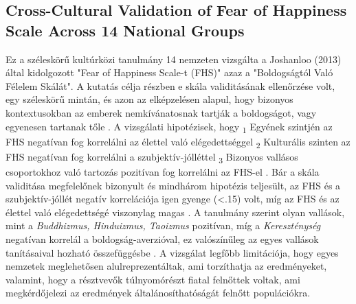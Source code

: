 \subsection*{Cross-Cultural Validation of
	Fear of Happiness Scale Across 14 National Groups \parencite{joshanloo_lepshokova_panyusheva_natalia_poon_yeung_sundaram_achoui_asano_igarashi}}
Ez a széleskörű kultúrközi tanulmány 14 nemzeten vizsgálta a Joshanloo (2013) által kidolgozott "Fear of Happiness Scale-t (FHS)" azaz a "Boldogságtól Való Félelem Skálát". A kutatás célja részben e skála validitásának ellenőrzése volt, egy széleskörű mintán, és azon az elképzelésen alapul, hogy bizonyos kontextusokban az emberek nemkívánatosnak tartják a boldogságot, vagy egyenesen tartanak tőle \parencite{joshanloo_lepshokova_panyusheva_natalia_poon_yeung_sundaram_achoui_asano_igarashi}. A vizsgálati hipotézisek, hogy \textsubscript{1} Egyének szintjén az FHS negatívan fog korrelálni az élettel való elégedettséggel \textsubscript{2} Kulturális szinten az FHS negatívan fog korrelálni a szubjektív-jólléttel \textsubscript{3} Bizonyos vallásos csoportokhoz való tartozás pozitívan fog korrelálni az FHS-el \parencite{joshanloo_lepshokova_panyusheva_natalia_poon_yeung_sundaram_achoui_asano_igarashi}. Bár a skála validitása megfelelőnek bizonyult és mindhárom hipotézis teljesült, az FHS és a szubjektív-jóllét negatív korrelációja igen gyenge (\textless.15) volt, míg az FHS és az élettel való elégedettségé viszonylag magas \parencite{joshanloo_lepshokova_panyusheva_natalia_poon_yeung_sundaram_achoui_asano_igarashi}. A tanulmány szerint olyan vallások, mint a \textit{Buddhizmus, Hinduizmus, Taoizmus} pozitívan, míg a \textit{Kereszténység} negatívan korrelál a boldogság-averzióval, ez valószínűleg az egyes vallások tanításaival hozható összefüggésbe \parencite{joshanloo_lepshokova_panyusheva_natalia_poon_yeung_sundaram_achoui_asano_igarashi}. A vizsgálat legfőbb limitációja, hogy egyes nemzetek meglehetősen alulreprezentáltak, ami torzíthatja az eredményeket, valamint, hogy a résztvevők túlnyomórészt fiatal felnőttek voltak, ami megkérdőjelezi az eredmények általánosíthatóságát felnőtt populációkra.

